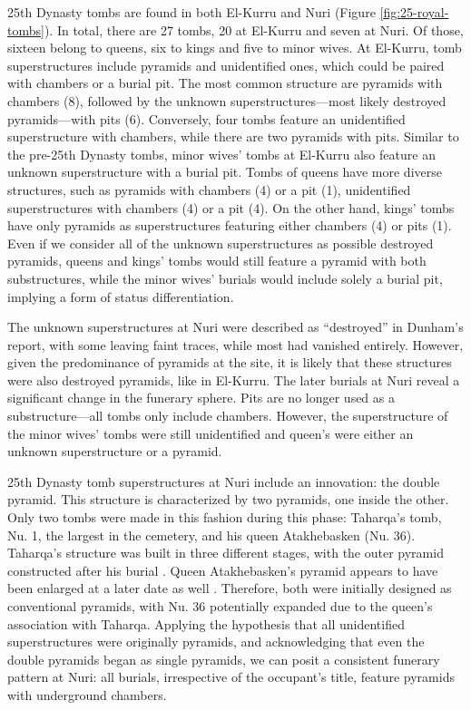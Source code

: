 25th Dynasty tombs are found in both El-Kurru and Nuri (Figure \ref{fig:25-royal-tombs}). In total, there are 27 tombs, 20 at El-Kurru and seven at Nuri. Of those, sixteen belong to queens, six to kings and five to minor wives. At El-Kurru, tomb superstructures include pyramids and unidentified ones, which could be paired with chambers or a burial pit. The most common structure are pyramids with chambers (8), followed by the unknown superstructures---most likely destroyed pyramids---with pits (6). Conversely, four tombs feature an unidentified superstructure with chambers, while there are two pyramids with pits. Similar to the pre-25th Dynasty tombs, minor wives' tombs at El-Kurru also feature an unknown superstructure with a burial pit. Tombs of queens have more diverse structures, such as pyramids with chambers (4) or a pit (1), unidentified superstructures with chambers (4) or a pit (4). On the other hand, kings' tombs have only pyramids as superstructures featuring either chambers (4) or pits (1). Even if we consider all of the unknown superstructures as possible destroyed pyramids, queens and kings' tombs would still feature a pyramid with both substructures, while the minor wives' burials would include solely a burial pit, implying a form of status differentiation.


The unknown superstructures at Nuri were described as “destroyed” in Dunham's report, with some leaving faint traces, while most had vanished entirely. However, given the predominance of pyramids at the site, it is likely that these structures were also destroyed pyramids, like in El-Kurru.	The later burials at Nuri reveal a significant change in the funerary sphere. Pits are no longer used as a substructure---all tombs only include chambers. However, the superstructure of the minor wives' tombs were still unidentified and queen's were either an unknown superstructure or a pyramid. 

25th Dynasty tomb superstructures at Nuri include an innovation: the double pyramid. This structure is characterized by two pyramids, one inside the other. Only two tombs were made in this fashion during this phase: Taharqa's tomb, Nu. 1, the largest in the cemetery, and  his queen Atakhebasken (Nu. 36). Taharqa's structure was built in three different stages, with the outer pyramid constructed after his burial \parencites[p.~118-119]{kendallWhyDidTaharqa2008}. Queen Atakhebasken's pyramid appears to have been enlarged at a later date as well \parencites[p.~108]{welsbyKingdomKushNapatan1996}. Therefore, both were initially designed as conventional pyramids, with Nu. 36 potentially expanded due to the queen's association with Taharqa. Applying the hypothesis that all unidentified superstructures were originally pyramids, and acknowledging that even the double pyramids began as single pyramids, we can posit a consistent funerary pattern at Nuri: all burials, irrespective of the occupant's title, feature pyramids with underground chambers.


